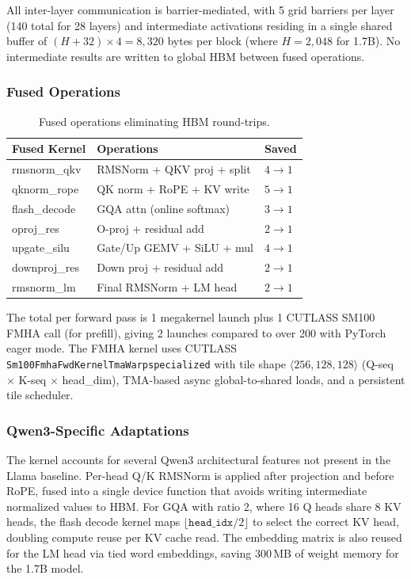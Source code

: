 \documentclass[sigplan,screen]{acmart}
\begin{document}
All inter-layer communication is barrier-mediated, with 5 grid barriers per layer (140 total for 28 layers) and intermediate activations residing in a single shared buffer of $(H + 32) \times 4 = 8{,}320$ bytes per block (where $H = 2{,}048$ for 1.7B). No intermediate results are written to global HBM between fused operations.

\subsubsection{Fused Operations}

\begin{table}[h]
  \caption{Fused operations eliminating HBM round-trips.}
  \label{tab:3}
  \small
  \begin{tabular}{lll}
    \toprule
    Fused Kernel & Operations & Saved \\
    \midrule
    rmsnorm\_qkv & RMSNorm + QKV proj + split & $4{\to}1$ \\
    qknorm\_rope & QK norm + RoPE + KV write & $5{\to}1$ \\
    flash\_decode & GQA attn (online softmax) & $3{\to}1$ \\
    oproj\_res & O-proj + residual add & $2{\to}1$ \\
    upgate\_silu & Gate/Up GEMV + SiLU + mul & $4{\to}1$ \\
    downproj\_res & Down proj + residual add & $2{\to}1$ \\
    rmsnorm\_lm & Final RMSNorm + LM head & $2{\to}1$ \\
    \bottomrule
  \end{tabular}
\end{table}

The total per forward pass is 1 megakernel launch plus 1 CUTLASS SM100 FMHA call (for prefill), giving 2 launches compared to over 200 with PyTorch eager mode. The FMHA kernel uses CUTLASS~\cite{cutlass} \texttt{Sm100FmhaFwdKernelTmaWarpspecialized} \newline with tile shape $\langle 256, 128, 128 \rangle$ (Q-seq $\times$ K-seq $\times$ head\_dim), TMA-based async global-to-shared loads, and a persistent tile scheduler.

\subsubsection{Qwen3-Specific Adaptations}

The kernel accounts for several Qwen3 architectural features not present in the Llama baseline. Per-head Q/K RMSNorm is applied after projection and before RoPE, fused into a single device function that avoids writing intermediate normalized values to HBM. For GQA with ratio 2, where 16 Q heads share 8 KV heads, the flash decode kernel maps $\lfloor \texttt{head\_idx} / 2 \rfloor$ to select the correct KV head, doubling compute reuse per KV cache read. The embedding matrix is also reused for the LM head via tied word embeddings, saving 300\,MB of weight memory for the 1.7B model.
\end{document}
